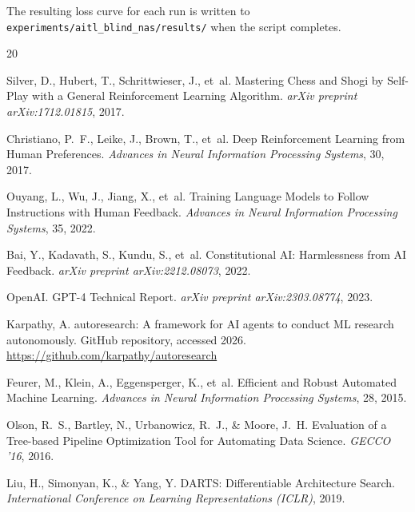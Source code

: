 \documentclass[11pt]{article}
\begin{document}
The resulting loss curve for each run is written to \texttt{experiments/aitl\_blind\_nas/results/} when the script completes.


\begin{thebibliography}{20}

Silver, D., Hubert, T., Schrittwieser, J., et~al.
\newblock Mastering Chess and Shogi by Self-Play with a General Reinforcement Learning Algorithm.
\newblock \emph{arXiv preprint arXiv:1712.01815}, 2017.

Christiano, P.~F., Leike, J., Brown, T., et~al.
\newblock Deep Reinforcement Learning from Human Preferences.
\newblock \emph{Advances in Neural Information Processing Systems}, 30, 2017.

Ouyang, L., Wu, J., Jiang, X., et~al.
\newblock Training Language Models to Follow Instructions with Human Feedback.
\newblock \emph{Advances in Neural Information Processing Systems}, 35, 2022.

Bai, Y., Kadavath, S., Kundu, S., et~al.
\newblock Constitutional AI: Harmlessness from AI Feedback.
\newblock \emph{arXiv preprint arXiv:2212.08073}, 2022.

OpenAI.
\newblock GPT-4 Technical Report.
\newblock \emph{arXiv preprint arXiv:2303.08774}, 2023.

Karpathy, A.
\newblock autoresearch: A framework for AI agents to conduct ML research autonomously.
\newblock GitHub repository, accessed 2026.
\newblock \url{https://github.com/karpathy/autoresearch}

Feurer, M., Klein, A., Eggensperger, K., et~al.
\newblock Efficient and Robust Automated Machine Learning.
\newblock \emph{Advances in Neural Information Processing Systems}, 28, 2015.

Olson, R.~S., Bartley, N., Urbanowicz, R.~J., \& Moore, J.~H.
\newblock Evaluation of a Tree-based Pipeline Optimization Tool for Automating Data Science.
\newblock \emph{GECCO '16}, 2016.

Liu, H., Simonyan, K., \& Yang, Y.
\newblock DARTS: Differentiable Architecture Search.
\newblock \emph{International Conference on Learning Representations (ICLR)}, 2019.


\end{thebibliography}
\end{document}
